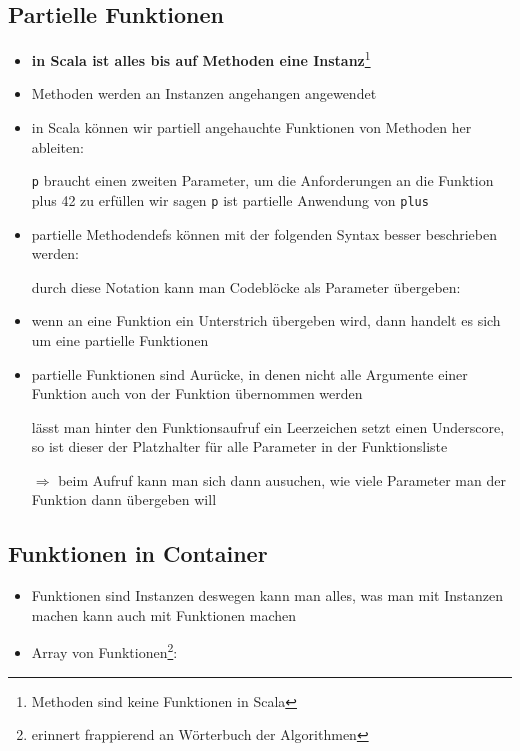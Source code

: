 \subsection{Partielle Funktionen}
\begin{itemize}
  \item \textbf{in Scala ist alles bis auf Methoden eine 
  Instanz}\footnote{Methoden sind keine Funktionen in Scala}
  \item Methoden werden an Instanzen angehangen \und angewendet
  \item in Scala können wir partiell angehauchte Funktionen von Methoden
  her ableiten:
  
  
  
  \texttt{p} braucht einen zweiten Parameter, um die Anforderungen an
  die Funktion plus 42 zu erfüllen \und wir sagen \texttt{p} ist
  partielle Anwendung von \texttt{plus}
  
  \item partielle Methodendefs können mit der folgenden Syntax besser
  beschrieben werden:
  
  
  
  
  durch diese Notation kann man Codeblöcke als Parameter übergeben:
  
  
  
    \item wenn an eine Funktion ein Unterstrich übergeben wird, dann handelt
  es sich um eine partielle Funktionen
  \item partielle Funktionen sind Aurücke, in denen nicht alle Argumente 
  einer Funktion auch von der Funktion übernommen werden
  
  
  
  lässt man hinter den Funktionsaufruf ein Leerzeichen
  \und setzt einen Underscore, so ist dieser der Platzhalter
  für alle Parameter in der Funktionsliste
  
  $\Rightarrow$ beim Aufruf kann man sich dann ausuchen,
  wie viele Parameter man der Funktion dann übergeben
  will
\end{itemize}


\subsection{Funktionen in Container}
\begin{itemize}
  \item Funktionen sind Instanzen \und deswegen kann man alles, was man
  mit Instanzen machen kann auch mit Funktionen machen
  \item Array von Funktionen\footnote{erinnert frappierend an
  Wörterbuch der Algorithmen}:
  
  
    
\end{itemize}


